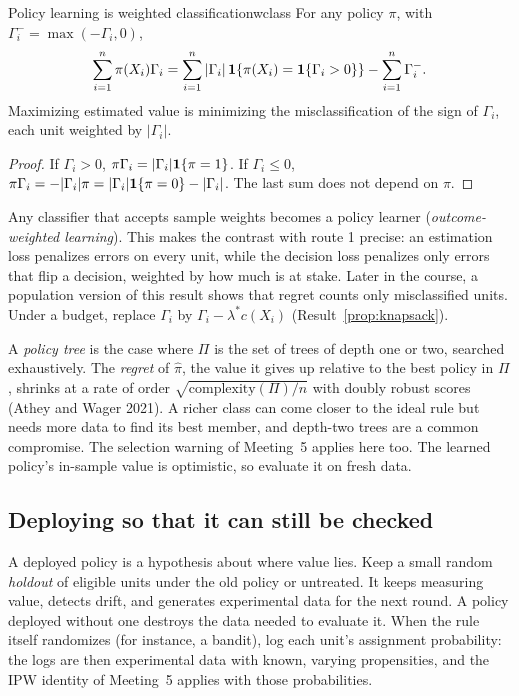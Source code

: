 \documentclass[11pt]{article}
\begin{document}
\begin{prop}{Policy learning is weighted classification}{wclass}
For any policy $\pi$, with $\Gamma_i^- = \max(-\Gamma_i, 0)$,
\[
  \sum_{i=1}^n \pi(X_i)\Gamma_i = \sum_{i=1}^n |\Gamma_i|\,\mathbf{1}\{\pi(X_i) = \mathbf{1}\{\Gamma_i > 0\}\} - \sum_{i=1}^n \Gamma_i^- .
\]
Maximizing estimated value is minimizing the misclassification of the sign of $\Gamma_i$, each unit weighted by $|\Gamma_i|$.
\end{prop}
\begin{proof}
If $\Gamma_i > 0$, $\pi\Gamma_i = |\Gamma_i|\mathbf{1}\{\pi = 1\}$. If $\Gamma_i \le 0$, $\pi\Gamma_i = -|\Gamma_i|\pi = |\Gamma_i|\mathbf{1}\{\pi = 0\} - |\Gamma_i|$.
The last sum does not depend on $\pi$.
\end{proof}

Any classifier that accepts sample weights becomes a policy learner (\emph{outcome-weighted learning}). This makes the
contrast with route 1 precise: an estimation loss penalizes errors on every unit, while the decision loss penalizes only errors
that flip a decision, weighted by how much is at stake. Later in the course, a population version of this result shows that regret counts
only misclassified units. Under a budget, replace $\Gamma_i$ by $\Gamma_i - \lambda^\ast c(X_i)$ (Result~\ref{prop:knapsack}).

A \emph{policy tree} is the case where $\Pi$ is the set of trees of depth one or two, searched exhaustively. The \emph{regret}
of $\hat\pi$, the value it gives up relative to the best policy in $\Pi$, shrinks at a rate of order $\sqrt{\text{complexity}(\Pi)/n}$
with doubly robust scores (Athey and Wager 2021). A richer class can come closer to the ideal rule but needs more data
to find its best member, and depth-two trees are a common compromise. The selection warning of Meeting~5 applies here
too. The learned policy's in-sample value is optimistic, so evaluate it on fresh data.

\subsection{Deploying so that it can still be checked}

A deployed policy is a hypothesis about where value lies. Keep a small random \emph{holdout} of eligible units under the
old policy or untreated. It keeps measuring value, detects drift, and generates experimental data for the next round. A
policy deployed without one destroys the data needed to evaluate it. When the rule itself randomizes (for instance, a
bandit), log each unit's assignment probability: the logs are then experimental data with known, varying propensities,
and the IPW identity of Meeting~5 applies with those probabilities.
\end{document}
